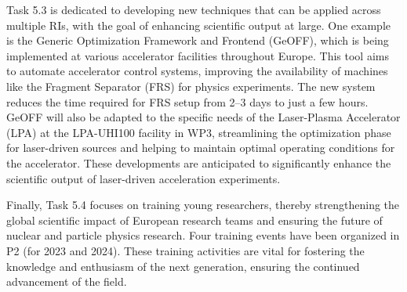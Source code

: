 Task 5.3 is dedicated to developing new techniques that can be applied across multiple RIs, with the goal of enhancing scientific output at large. One example is the Generic Optimization Framework and Frontend (GeOFF), which is being implemented at various accelerator facilities throughout Europe. This tool aims to automate accelerator control systems, improving the availability of machines like the Fragment Separator (FRS) for physics experiments. The new system reduces the time required for FRS setup from 2–3 days to just a few hours. GeOFF will also be adapted to the specific needs of the Laser-Plasma Accelerator (LPA) at the LPA-UHI100 facility in WP3, streamlining the optimization phase for laser-driven sources and helping to maintain optimal operating conditions for the accelerator. These developments are anticipated to significantly enhance the scientific output of laser-driven acceleration experiments.

Finally, Task 5.4 focuses on training young researchers, thereby strengthening the global scientific impact of European research teams and ensuring the future of nuclear and particle physics research. 
Four training events have been organized in P2 (for 2023 and 2024). These training activities are vital for fostering the knowledge and enthusiasm of the next generation, ensuring the continued advancement of the field.

